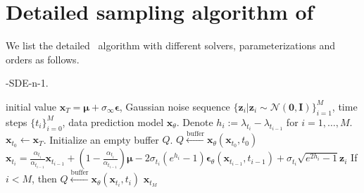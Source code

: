 \section{Detailed sampling algorithm of \ourmethod}
\label{appc}

We list the detailed \ourmethod~algorithm with different solvers, parameterizations and orders as follows.

\begin{algorithm}[H]
    \centering
    \caption{\ourmethod-SDE-n-1.}\label{alg:sde-n-1}
    \begin{algorithmic}[1]
    \REQUIRE initial value $\boldsymbol{x}_T=\boldsymbol\mu+\sigma_\infty\boldsymbol\epsilon$, Gaussian noise sequence $\{\boldsymbol{z}_i|\boldsymbol{z}_i\sim\mathcal{N}(\boldsymbol{0}, \boldsymbol{I})\}_{i=1}^M$, time steps $\{t_i\}_{i=0}^M$, data prediction model $\boldsymbol{x}_\theta$. Denote $h_i:=\lambda_{t_i}-\lambda_{t_{i-1}}$ for $i=1,\ldots,M$.
        \STATE $\boldsymbol{x}_{t_0}\leftarrow\boldsymbol{x}_T$. Initialize an empty buffer $Q$.
        \STATE $Q\xleftarrow{\text{buffer}}\boldsymbol{x}_\theta(\boldsymbol{x}_{t_0},t_0)$
        \STATE $\boldsymbol{x}_{t_{i}}=\frac{\alpha_{t_i}}{\alpha_{t_{i-1}}}\boldsymbol{x}_{t_{i-1}}
        +\left(1-\frac{\alpha_{t_i}}{\alpha_{t_{i-1}}}\right)\boldsymbol{\mu}-2\sigma_{t_i}(e^{h_i}-1)\boldsymbol{\epsilon}_\theta(\boldsymbol{x}_{t_{i-1}},t_{i-1})
        +\sigma_{t_i}\sqrt{e^{2h_i}-1}\boldsymbol{z}_i$
        \STATE If $i < M$, then $Q \xleftarrow{\text{buffer}} \boldsymbol{x}_\theta(\boldsymbol{x}_{t_i}, t_i)$
        \ENDFOR
        \RETURN $\boldsymbol{x}_{t_M}$
    \end{algorithmic}
\end{algorithm}

